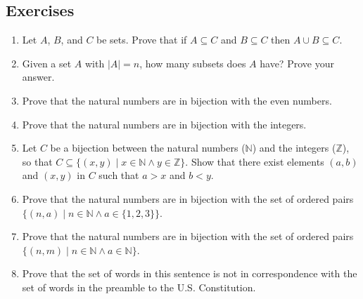 \subsection{Exercises}
\begin{enumerate}
    \item Let $A$, $B$, and $C$ be sets.  Prove that if $A \subseteq C$ and $B \subseteq C$ then $A \cup B \subseteq C$.

    \item Given a set $A$ with $|A|=n$, how many subsets does $A$ have?  Prove your answer.

    \item Prove that the natural numbers are in bijection with the even numbers.

    \item Prove that the natural numbers are in bijection with the integers.

    \item Let $C$ be a bijection between the natural numbers ($\mathbb{N}$) and the integers ($\mathbb{Z}$), so that $C\subseteq\{(x,y)\mid x\in \mathbb{N}\land y\in\mathbb{Z}\}$.  Show that there exist elements $(a, b)$ and $(x,y)$ in $C$ such that $a > x$ and $b < y$.

    \item Prove that the natural numbers are in bijection with the set of ordered pairs $\{(n, a) \mid n\in \mathbb{N} \land a \in \{1,2,3\}\}$.

    \item Prove that the natural numbers are in bijection with the set of ordered pairs $\{(n, m) \mid n\in \mathbb{N} \land a \in \mathbb{N}\}$.

    \item Prove that the set of words in this sentence is not in correspondence with the set of words in the preamble to the U.S. Constitution.
\end{enumerate}
